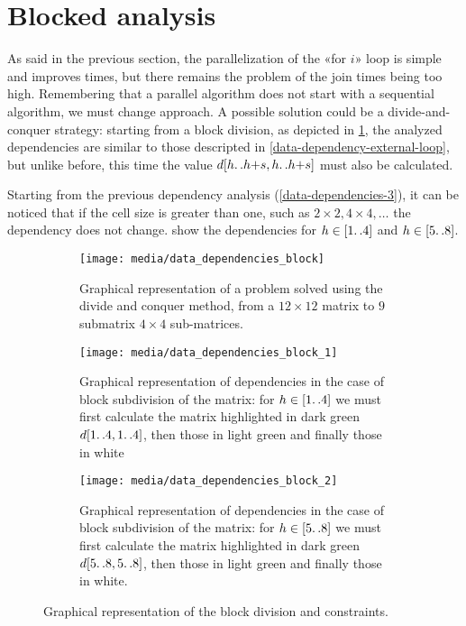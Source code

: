 \section{Blocked analysis}\label{blocked_parallelization}

As said in the previous section, the parallelization of the «for \(i\)» loop is simple and improves times, but there remains the problem of the join times being too high. 
Remembering that a parallel algorithm does not start with a sequential algorithm, we must change approach.
A possible solution could be a divide-and-conquer strategy: starting from a block division, as depicted in \cref{submatrix}, the analyzed dependencies are similar to those descripted in \cref{data-dependency-external-loop}, but unlike before, this time the value \(d[h{\mathinner {\ldotp \ldotp}}h{+}s,h{\mathinner {\ldotp \ldotp}}h{+}s]\) must also be calculated.

Starting from the previous dependency analysis (\cref{data-dependencies-3}), it can be noticed that if the cell size is greater than one, such as  \(  2 \times 2,  4 \times 4, \dots\) the dependency does not change.
 show the dependencies for \(h \in [1{\mathinner {\ldotp \ldotp}}4]\) and \(h \in [5{\mathinner {\ldotp \ldotp}}8]\).

\begin{figure}[htbp]
    \centering
    \begin{subfigure}[t]{0.3\textwidth}
        \texttt{[image: media/data\_dependencies\_block]}
        \caption{Graphical representation of a problem solved using the divide and conquer method, from a \(12\times 12\) matrix to \(9\) submatrix \(4\times 4\) sub-matrices.}
        \label{submatrix}
    \end{subfigure}
    \hfill
    \begin{subfigure}[t]{0.3\textwidth}
        \texttt{[image: media/data\_dependencies\_block\_1]}
        \caption{Graphical representation of dependencies in the case of block subdivision of the matrix: for \(h \in [1{\mathinner {\ldotp \ldotp}}4]\) we must first calculate the matrix highlighted in dark green \(d[1{\mathinner {\ldotp \ldotp}}4,1{\mathinner {\ldotp \ldotp}}4]\), then those in light green and finally those in white}
        \label{data-dependencies-block-1}
    \end{subfigure}
    \hfill
    \begin{subfigure}[t]{0.3\textwidth}
        \texttt{[image: media/data\_dependencies\_block\_2]}
        \caption{Graphical representation of dependencies in the case of block subdivision of the matrix: for \(h \in [5{\mathinner {\ldotp \ldotp}}8]\) we must first calculate the matrix highlighted in dark green \(d[5{\mathinner {\ldotp \ldotp}}8,5{\mathinner {\ldotp \ldotp}}8]\), then those in light green and finally those in white.}
        \label{data-dependencies-block-2}
    \end{subfigure}
    \caption{Graphical representation of the block division and constraints.}
    \label{data-representation-of-the-block-division-and-constraints}
\end{figure}

